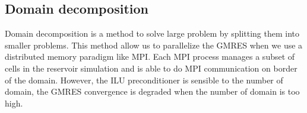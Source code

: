 \subsection{Domain decomposition}
Domain decomposition is a method to solve large problem by splitting them into smaller problems.
%
This method allow us to parallelize the GMRES when we use a distributed memory paradigm like MPI.
%
Each MPI process manages a subset of cells in the reservoir simulation and is able to do MPI communication on border of the domain.
%
However, the ILU preconditioner is sensible to the number of domain, the GMRES convergence is degraded when the number of domain is too high.
